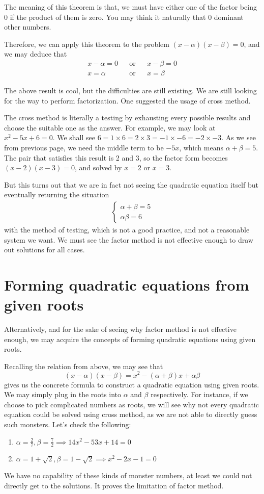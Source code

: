 \documentclass[12pt]{article}
\begin{document}
    The meaning of this theorem is that, we must have either one of the factor being 0 if the product of them is zero. You may think it naturally that 0 dominant other numbers.

    Therefore, we can apply this theorem to the problem $(x-\alpha)(x-\beta)=0$, and we may deduce that 
    \begin{align*}
        x-\alpha=0&&\textrm{or}&&x-\beta=0\\
        x=\alpha&&\textrm{or}&&x=\beta
    \end{align*}

    The above result is cool, but the difficulties are still existing. We are still looking for the way to perform factorization. One suggested the usage of cross method.

    The cross method is literally a testing by exhausting every possible results and choose the suitable one as the answer. For example, we may look at $x^2-5x+6=0$. We shall see $6=1\times 6=2\times 3=-1\times -6=-2\times -3$. As we see from previous page, we need the middle term to be $-5x$, which means $\alpha+\beta=5$. The pair that satisfies this result is 2 and 3, so the factor form becomes $(x-2)(x-3)=0$, and solved by $x=2$ or $x=3$.

    But this turns out that we are in fact not seeing the quadratic equation itself but eventually returning the situation 
    \begin{align*}
        \begin{cases}
            \alpha+\beta=5\\
            \alpha\beta=6
        \end{cases}
    \end{align*}
    with the method of testing, which is not a good practice, and not a reasonable system we want. We must see the factor method is not effective enough to draw out solutions for all cases. 

    \section*{Forming quadratic equations from given roots}
    Alternatively, and for the sake of seeing why factor method is not effective enough, we may acquire the concepts of forming quadratic equations using given roots.

    Recalling the relation from above, we may see that $$(x-\alpha)(x-\beta)=x^2-(\alpha+\beta)x+\alpha\beta$$ gives us the concrete formula to construct a quadratic equation using given roots. We may simply plug in the roots into $\alpha$ and $\beta$ respectively. For instance, if we choose to pick complicated numbers as roots, we will see why not every quadratic equation could be solved using cross method, as we are not able to directly guess such monsters. Let's check the following:
    \begin{enumerate}
        \item $\alpha=\frac{2}{7}, \beta=\frac{7}{2}\implies 14x^2-53x+14=0$
        \item $\alpha=1+\sqrt{2}, \beta=1-\sqrt{2}\implies x^2-2x-1=0$
    \end{enumerate}
    
    We have no capability of these kinds of monster numbers, at least we could not directly get to the solutions. It proves the limitation of factor method.
\end{document}
